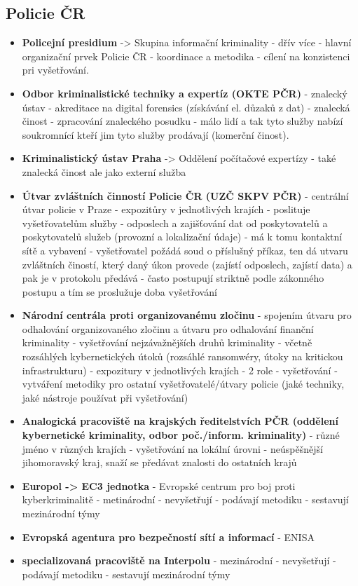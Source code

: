 \subsection{Policie ČR}
\begin{itemize}
    \item\textbf{ Policejní presidium} -> Skupina informační kriminality - dřív více - hlavní organizační prvek
Policie ČR - koordinace a metodika - cílení na konzistenci pri vyšetřování.
 \item \textbf{Odbor kriminalistické techniky a expertíz (OKTE PČR)} - znalecký ústav - akreditace na
digital forensics (získávání el. důzaků z dat) - znalecká činost - zpracování znaleckého
posudku - málo lidí a tak tyto služby nabízí soukromnící kteří jim tyto služby prodávají
(komerční činost).
 \item \textbf{Kriminalistický ústav Praha} -> Oddělení počítačové expertízy - také znalecká činost ale jako
externí služba
 \item \textbf{Útvar zvláštních činností Policie ČR (UZČ SKPV PČR)} - centrální útvar policie v Praze -
expozitůry v jednotlivých krajích - poslituje vyšetřovatelům služby - odposlech a zajišťování
dat od poskytovatelů a poskytovatelů služeb (provozní a lokalizační údaje) - má k tomu
kontaktní sítě a vybavení - vyšetřovatel požádá soud o příslušný příkaz, ten dá utvaru
zvláštních čiností, který daný úkon provede (zajístí odposlech, zajístí data) a pak je v
protokolu předává - často postupují striktně podle zákonného postupu a tím se proslužuje
doba vyšetřování
 \item \textbf{Národní centrála proti organizovanému zločinu} - spojením útvaru pro odhalování
organizovaného zločinu a útvaru pro odhalování finanční kriminality - vyšetřování
nejzávažnějších druhů kriminality - včetně rozsáhlých kybernetických útoků (rozsáhlé
ransomwéry, útoky na kritickou infrastrukturu) - expozitury v jednotlivých krajích - 2 role -
vyšetřování - vytváření metodiky pro ostatní vyšetřovatelé/útvary policie (jaké techniky, jaké
nástroje používat při vyšetřování)
 \item \textbf{Analogická pracoviště na krajských ředitelstvích PČR (oddělení kybernetické kriminality,
odbor poč./inform. kriminality)} - různé jméno v různých krajích - vyšetřování na lokální úrovni
- neúspěšnější jihomoravský kraj, snaží se předávat znalosti do ostatních krajů
 \item \textbf{Europol -> EC3 jednotka} - Evropské centrum pro boj proti kyberkriminalitě - metinárodní -
nevyšetřují - podávají metodiku - sestavují mezinárodní týmy
 \item \textbf{Evropská agentura pro bezpečností sítí a informací} - ENISA
 \item \textbf{specializovaná pracoviště na Interpolu} - mezinárodní - nevyšetřují - podávají metodiku -
sestavují mezinárodní týmy
\end{itemize}


